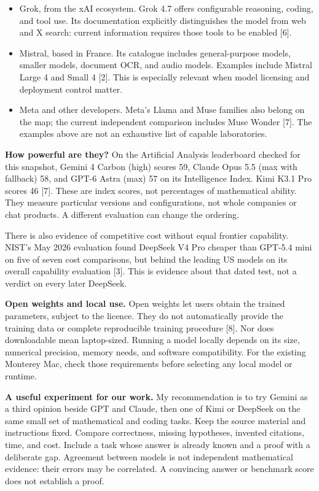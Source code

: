 \begin{itemize}
\item Grok, from the xAI ecosystem.
Grok 4.7 offers configurable reasoning,
coding, and tool use. Its documentation
explicitly distinguishes the model from
web and X search: current information
requires those tools to be enabled [6].

\item Mistral, based in France.
Its catalogue includes general-purpose
models, smaller models, document OCR,
and audio models. Examples include
Mistral Large 4 and Small 4 [2].
This is especially relevant when model
licensing and deployment control matter.

\item Meta and other developers.
Meta's Llama and Muse families also
belong on the map; the current independent
comparison includes Muse Wonder [7].
The examples above are not an exhaustive
list of capable laboratories.
\end{itemize}

\medskip\noindent
\textbf{How powerful are they?}
On the Artificial Analysis leaderboard
checked for this snapshot, Gemini 4 Carbon
(high) scores 59, Claude Opus 5.5
(max with fallback) 58, and GPT-6 Astra
(max) 57 on its Intelligence Index.
Kimi K3.1 Pro scores 46 [7].
These are index scores, not percentages
of mathematical ability. They measure
particular versions and configurations,
not whole companies or chat products.
A different evaluation can change the
ordering.

There is also evidence of competitive
cost without equal frontier capability.
NIST's May 2026 evaluation found DeepSeek
V4 Pro cheaper than GPT-5.4 mini on five
of seven cost comparisons, but behind
the leading US models on its overall
capability evaluation [3].
This is evidence about that dated test,
not a verdict on every later DeepSeek.

\medskip\noindent
\textbf{Open weights and local use.}
Open weights let users obtain the trained
parameters, subject to the licence.
They do not automatically provide the
training data or complete reproducible
training procedure [8].
Nor does downloadable mean laptop-sized.
Running a model locally depends on its
size, numerical precision, memory needs,
and software compatibility.
For the existing Monterey Mac, check
those requirements before selecting any
local model or runtime.

\medskip\noindent
\textbf{A useful experiment for our work.}
My recommendation is to try Gemini as a
third opinion beside GPT and Claude, then
one of Kimi or DeepSeek on the same small
set of mathematical and coding tasks.
Keep the source material and instructions
fixed. Compare correctness, missing
hypotheses, invented citations, time,
and cost. Include a task whose answer
is already known and a proof with a
deliberate gap. Agreement between models
is not independent mathematical evidence:
their errors may be correlated.
A convincing answer or benchmark score
does not establish a proof.

